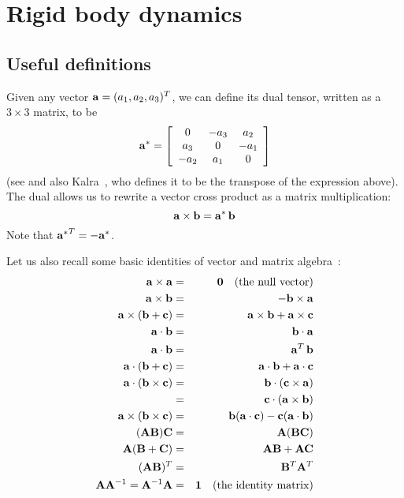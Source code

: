 \section{Rigid body dynamics\label{rigidBodyAppendix}}
\subsection{Useful definitions}

Given any vector $\ve{a} = (a_1, a_2, a_3)^T$, we can define its dual
tensor, written as a $3\times3$ matrix, to be
\begin{equation}
\dual{\ve{a}} = \left[\begin{array}{ccc}
    0 & -a_3 & a_2 \\ a_3 & 0 & -a_1 \\ -a_2 & a_1 & 0
    \end{array}\right]
\end{equation}
(see \cite{RHB:02,BaraffWitkin:97} and also Kalra~\cite{Kalra:95}, who defines it to be
the transpose of the expression above).
The dual allows us to rewrite a vector cross product as a matrix multiplication:
\begin{equation}
\ve{a}\times\ve{b} = \dual{\ve{a}}\,\ve{b}
\end{equation}
Note that $\dual{\ve{a}}^T = -\dual{\ve{a}}$.

Let us also recall some basic identities of vector and matrix algebra~\cite{RHB:02}:
\begin{eqnarray*}
\ve{a}\times\ve{a} & = & \ve{0}\quad\mathrm{(the~null~vector)} \\
\ve{a}\times\ve{b} & = & -\ve{b}\times\ve{a} \\
\ve{a}\times(\ve{b} + \ve{c}) & = & \ve{a}\times\ve{b} + \ve{a}\times\ve{c} \\
\ve{a}\cdot\ve{b} & = & \ve{b}\cdot\ve{a} \\
\ve{a}\cdot\ve{b} & = & \ve{a}^T\,\ve{b} \\
\ve{a}\cdot(\ve{b} + \ve{c}) & = & \ve{a}\cdot\ve{b} + \ve{a}\cdot\ve{c} \\
\ve{a}\cdot(\ve{b}\times\ve{c}) & = & \ve{b}\cdot(\ve{c}\times\ve{a}) \\
    & = & \ve{c}\cdot(\ve{a}\times\ve{b}) \\
\ve{a}\times(\ve{b}\times\ve{c}) & = &
    \ve{b}(\ve{a}\cdot\ve{c}) - \ve{c}(\ve{a}\cdot\ve{b}) \\
(\m{A}\m{B})\m{C} & = & \m{A}(\m{B}\m{C}) \\
\m{A}(\m{B} + \m{C}) & = & \m{A}\m{B} + \m{A}\m{C} \\
(\m{A}\m{B})^T & = & \m{B}^T\m{A}^T \\
\m{A}\m{A}^{-1} = \m{A}^{-1}\m{A} & = & \m{1}\quad\mathrm{(the~identity~matrix)}
\end{eqnarray*}


